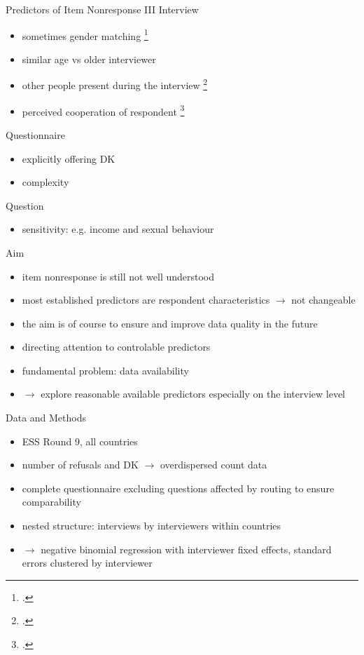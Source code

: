 \documentclass[aspectratio=169]{beamer}
\begin{document}
 \begin{frame}{Predictors of Item Nonresponse III}
 Interview
 \begin{itemize}
  \item sometimes gender matching \footcite{vercruyssenEffectSociodemographicMis2017}
  \item similar age vs older interviewer
  \item other people present during the interview \footcite{kupekDeterminantsItemNonresponse1998}
  \item perceived cooperation of respondent \footcite{tuSocialDistanceRespondent2007}
 \end{itemize}
 
 Questionnaire
 \begin{itemize}
  \item explicitly offering DK
  \item complexity
 \end{itemize}

 Question
 \begin{itemize}
  \item sensitivity: e.g. income and sexual behaviour
 \end{itemize}

\end{frame}


\begin{frame}{Aim}
\begin{itemize}
 \item item nonresponse is still not well understood
 \item most established predictors are respondent characteristics $\rightarrow$ not changeable
 \item the aim is of course to ensure and improve data quality in the future
 \item directing attention to controlable predictors
 \item fundamental problem: data availability
 \item $\rightarrow$ explore reasonable available predictors especially on the interview level
\end{itemize}

\end{frame}


\begin{frame}{Data and Methods}
 \begin{itemize}
 \item ESS Round 9, all countries
  \item number of refusals and DK $\rightarrow$ overdispersed count data
  \item complete questionnaire excluding questions affected by routing to ensure comparability
  \item nested structure: interviews by interviewers within countries
  \item $\rightarrow$ negative binomial regression with interviewer fixed effects, standard errors clustered by interviewer
 \end{itemize}

\end{frame}
\end{document}
